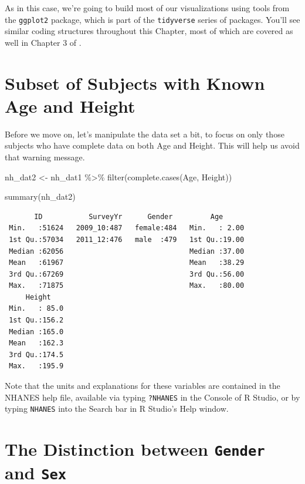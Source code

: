 \documentclass[
]{book}
\newenvironment{Shaded}{\begin{snugshade}}{\end{snugshade}}
\newcommand{\FunctionTok}[1]{\textcolor[rgb]{0.00,0.00,0.00}{#1}}
\newcommand{\NormalTok}[1]{#1}
\newcommand{\OtherTok}[1]{\textcolor[rgb]{0.56,0.35,0.01}{#1}}
\newcommand{\SpecialCharTok}[1]{\textcolor[rgb]{0.00,0.00,0.00}{#1}}
\begin{document}
As in this case, we're going to build most of our visualizations using tools from the \texttt{ggplot2} package, which is part of the \texttt{tidyverse} series of packages. You'll see similar coding structures throughout this Chapter, most of which are covered as well in Chapter 3 of \citet{R4DS}.

\hypertarget{subset-of-subjects-with-known-age-and-height}{%
\section{Subset of Subjects with Known Age and Height}\label{subset-of-subjects-with-known-age-and-height}}

Before we move on, let's manipulate the data set a bit, to focus on only those subjects who have complete data on both Age and Height. This will help us avoid that warning message.

\begin{Shaded}
\begin{Highlighting}[]
\NormalTok{nh\_dat2 }\OtherTok{\textless{}{-}}\NormalTok{ nh\_dat1 }\SpecialCharTok{\%\textgreater{}\%}
    \FunctionTok{filter}\NormalTok{(}\FunctionTok{complete.cases}\NormalTok{(Age, Height)) }

\FunctionTok{summary}\NormalTok{(nh\_dat2)}
\end{Highlighting}
\end{Shaded}

\begin{verbatim}
       ID           SurveyYr      Gender         Age       
 Min.   :51624   2009_10:487   female:484   Min.   : 2.00  
 1st Qu.:57034   2011_12:476   male  :479   1st Qu.:19.00  
 Median :62056                              Median :37.00  
 Mean   :61967                              Mean   :38.29  
 3rd Qu.:67269                              3rd Qu.:56.00  
 Max.   :71875                              Max.   :80.00  
     Height     
 Min.   : 85.0  
 1st Qu.:156.2  
 Median :165.0  
 Mean   :162.3  
 3rd Qu.:174.5  
 Max.   :195.9  
\end{verbatim}

Note that the units and explanations for these variables are contained in the NHANES help file, available via typing \texttt{?NHANES} in the Console of R Studio, or by typing \texttt{NHANES} into the Search bar in R Studio's Help window.

\hypertarget{the-distinction-between-gender-and-sex}{%
\section{\texorpdfstring{The Distinction between \texttt{Gender} and \texttt{Sex}}{The Distinction between Gender and Sex}}\label{the-distinction-between-gender-and-sex}}
\end{document}
